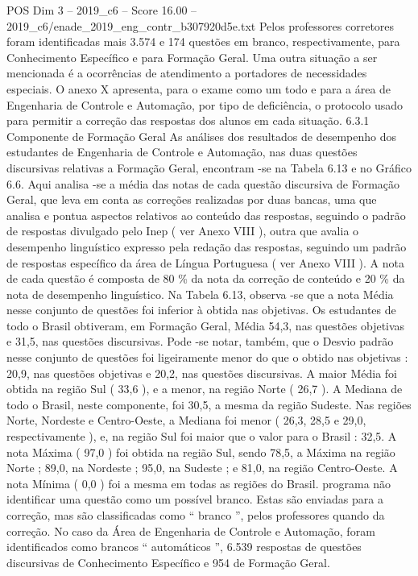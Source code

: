 \begin{textsample}{POS Dim 3 – 2019\_c6 – Score 16.00 – 2019\_c6/enade\_2019\_eng\_contr\_b307920d5e.txt}
Pelos professores corretores foram identificadas mais 3.574 e 174 questões em branco, respectivamente, para Conhecimento Específico e para Formação Geral.
Uma outra situação a ser mencionada é a ocorrências de atendimento a portadores de necessidades especiais.
O anexo X apresenta, para o exame como um todo e para a área de Engenharia de Controle e Automação, por tipo de deficiência, o protocolo usado para permitir a correção das respostas dos alunos em cada situação. 6.3.1 Componente de Formação Geral As análises dos resultados de desempenho dos estudantes de Engenharia de Controle e Automação, nas duas questões discursivas relativas a Formação Geral, encontram -se na Tabela 6.13 e no Gráfico 6.6.
Aqui analisa -se a média das notas de cada questão discursiva de Formação Geral, que leva em conta as correções realizadas por duas bancas, uma que analisa e pontua aspectos relativos ao conteúdo das respostas, seguindo o padrão de respostas divulgado pelo Inep ( ver Anexo VIII ), outra que avalia o desempenho linguístico expresso pela redação das respostas, seguindo um padrão de respostas específico da área de Língua Portuguesa ( ver Anexo VIII ).
A nota de cada questão é composta de 80 \% da nota da correção de conteúdo e 20 \% da nota de desempenho linguístico.
Na Tabela 6.13, observa -se que a nota Média nesse conjunto de questões foi inferior à obtida nas objetivas.
Os estudantes de todo o Brasil obtiveram, em Formação Geral, Média 54,3, nas questões objetivas e 31,5, nas questões discursivas.
Pode -se notar, também, que o Desvio padrão nesse conjunto de questões foi ligeiramente menor do que o obtido nas objetivas : 20,9, nas questões objetivas e 20,2, nas questões discursivas.
A maior Média foi obtida na região Sul ( 33,6 ), e a menor, na região Norte ( 26,7 ).
A Mediana de todo o Brasil, neste componente, foi 30,5, a mesma da região Sudeste.
Nas regiões Norte, Nordeste e Centro-Oeste, a Mediana foi menor ( 26,3, 28,5 e 29,0, respectivamente ), e, na região Sul foi maior que o valor para o Brasil : 32,5.
A nota Máxima ( 97,0 ) foi obtida na região Sul, sendo 78,5, a Máxima na região Norte ; 89,0, na Nordeste ; 95,0, na Sudeste ; e 81,0, na região Centro-Oeste.
A nota Mínima ( 0,0 ) foi a mesma em todas as regiões do Brasil. programa não identificar uma questão como um possível branco.
Estas são enviadas para a correção, mas são classificadas como “ branco ”, pelos professores quando da correção.
No caso da Área de Engenharia de Controle e Automação, foram identificados como brancos “ automáticos ”, 6.539 respostas de questões discursivas de Conhecimento Específico e 954 de Formação Geral.

\end{textsample}
